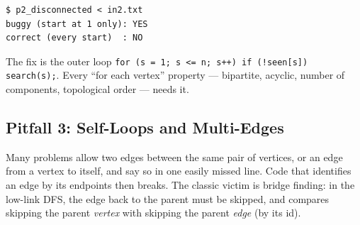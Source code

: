 \begin{diagrambox}
\end{diagrambox}

\begin{lstlisting}[style=trace]
$ p2_disconnected < in2.txt
buggy (start at 1 only): YES
correct (every start)  : NO
\end{lstlisting}

The fix is the outer loop \texttt{for (s = 1; s <= n; s++) if (!seen[s]) search(s);}. Every ``for each vertex'' property --- bipartite, acyclic, number of components, topological order --- needs it.

\subsection{Pitfall 3: Self-Loops and Multi-Edges}
\label{ssec:ts-p3}

Many problems allow two edges between the same pair of vertices, or an edge from a vertex to itself, and say so in one easily missed line. Code that identifies an edge by its endpoints then breaks. The classic victim is bridge finding: in the low-link DFS, the edge back to the parent must be skipped, and  compares skipping the parent \emph{vertex} with skipping the parent \emph{edge} (by its id).

